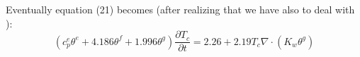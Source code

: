 Eventually equation (21) becomes (after realizing that we have also to deal with ):
\begin{equation}
(c_p^e \theta^e + 4.186 \theta^f + 1.996 \theta^g) \frac{\partial T_c}{\partial t} = 2.26 + 2.19 T_c \nabla \cdot ( K_w  \theta^g)
\end{equation}